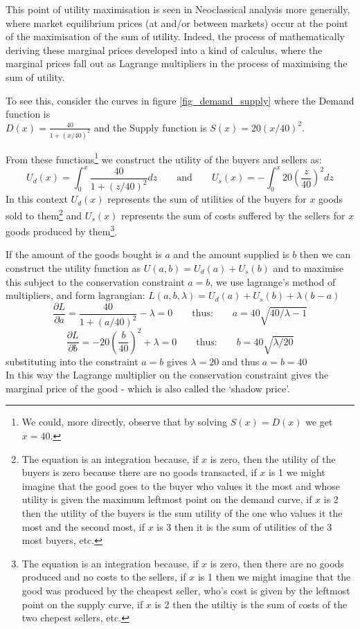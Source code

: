 This point of utility maximisation is seen in Neoclassical analysis more generally, where market equilibrium prices (at and/or between markets) occur at the point of the maximisation of the sum of utility. Indeed, the process of mathematically deriving these marginal prices developed into a kind of calculus, where the marginal prices fall out as Lagrange multipliers in the process of maximising the sum of utility.

To see this, consider the curves in figure \ref{fig_demand_supply} where the Demand function is\\ $D(x) = \frac{40}{1+(x/40)^2}$ and the Supply function is $S(x) = 20(x/40)^2$.

From these functions\footnote{We could, more directly, observe that by solving $S(x)=D(x)$ we get $x=40$.} we construct the utility of the buyers and sellers as:
$$U_d(x) = \int_0^x\frac{40}{1+(z/40)^2}dz \quad\quad\text{and}\quad\quad U_s(x) = -\int_0^x20\left(\frac{z}{40}\right)^2dz$$
In this context $U_d(x)$ represents the sum of utilities of the buyers for $x$ goods sold to them\footnote{The equation is an integration because, if $x$ is zero, then the utility of the buyers is zero because there are no goods transacted, if $x$ is 1 we might imagine that the good goes to the buyer who values it the most and whose utility is given the maximum leftmost point on the demand curve, if $x$ is 2 then the utility of the buyers is the sum utility of the one who values it the most and the second most, if $x$ is 3 then it is the sum of utilities of the 3 most buyers, etc.} and $U_s(x)$ represents the sum of costs suffered by the sellers for $x$ goods produced by them\footnote{The equation is an integration because, if $x$ is zero, then there are no goods produced and no costs to the sellers, if $x$ is 1 then we might imagine that the good was produced by the cheapest seller, who's cost is given by the leftmost point on the supply curve, if $x$ is 2 then the utiltiy is the sum of costs of the two chepest sellers, etc.}.

If the amount of the goods bought is $a$ and the amount supplied is $b$ then we can construct the utility function as $U(a,b) = U_d(a) + U_s(b)$
and to maximise this subject to the conservation constraint $a=b$, we use lagrange's method of multipliers, and form lagrangian:
$L(a,b,\lambda) = U_d(a) + U_s(b) + \lambda(b-a)$
$$\frac{\partial L}{\partial a} = \frac{40}{1+(a/40)^2} - \lambda = 0 \quad\quad\text{thus:}\quad\quad a = 40\sqrt{40/\lambda - 1}$$
$$\frac{\partial L}{\partial b} = -20\left(\frac{b}{40}\right)^2 + \lambda = 0 \quad\quad\text{thus:}\quad\quad b = 40\sqrt{\lambda/20}$$
substituting into the constraint $a=b$ gives $\lambda=20$ and thus $a=b=40$\\
In this way the Lagrange multiplier on the conservation constraint gives the marginal price of the good - which is also called the `shadow price'.

